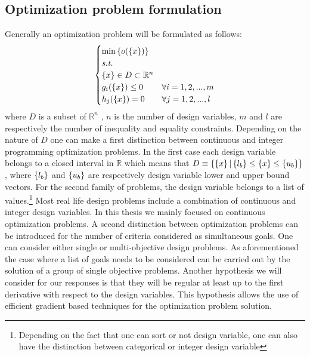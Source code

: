 \subsection {Optimization problem formulation}
Generally an optimization problem will be formulated as follows:
\begin{equation}
\label{nlp}
\begin{cases}
\min{\ensuremath\left\lbrace{o(\ensuremath\left\lbrace{x}\right \rbrace)}\right \rbrace}\\
\textit{s.t.}\\
\left\lbrace{x}\right \rbrace\in D \subset \mathbb{R}^{n}\\
g_i(\left\lbrace{x}\right \rbrace)\leq 0 & \forall i=1,2,...,m\\
h_j(\left\lbrace{x}\right \rbrace)=0 & \forall j=1,2,...,l
\end{cases}
\end{equation}
where $D$ is a subset of $\mathbb{R}^{n}$ , $n$ is the number of design variables, $m$ and $l$ are respectively the number of inequality and equality constraints. Depending on the nature of $D$ one can make a first distinction between continuous and integer programming optimization problems. In the first case each design variable belongs to a closed interval in $\mathbb{R}$ which means that $D\equiv\lbrace \left\lbrace{x}\right \rbrace | \left\lbrace{l_b}\right \rbrace\leq\left\lbrace{x}\right \rbrace\leq \left\lbrace{u_b}\right \rbrace\rbrace$, where $\left\lbrace{l_b}\right \rbrace$ and $\left\lbrace{u_b}\right \rbrace$ are respectively design variable lower and upper bound vectors. For the second family of problems, the design variable belongs to a list of values.\footnote{Depending on the fact that one can sort or not design variable, one can also have the distinction between categorical or integer design variable} Most real life design problems include a combination of continuous and integer design variables. 
In this thesis we mainly focused on continuous optimization problems. A second distinction between optimization problems can be introduced for the number of criteria considered as simultaneous goals. One can consider either single or multi-objective design problems. As aforementioned the case where a list of goals needs to be considered can be carried out by the solution of a group of single objective problems. Another hypothesis we will consider for our responses is that they will be regular at least up to the first derivative with respect to the design variables. This hypothesis allows the use of efficient gradient based techniques for the optimization problem solution. 
 
